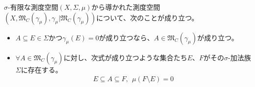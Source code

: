 \documentclass[dvipdfmx]{jsarticle}
\begin{document}
\begin{thm}\label{4.5.3.25}
$\sigma$-有限な測度空間$(X,\varSigma,\mu)$から導かれた測度空間$\left( X,\mathfrak{M}_{C}\left( \gamma_{\mu} \right),\gamma_{\mu}|\mathfrak{M}_{C}\left( \gamma_{\mu} \right) \right)$について、次のことが成り立つ。
\begin{itemize}
\item
  $A \subseteq E \in \varSigma$かつ$\gamma_{\mu}(E) = 0$が成り立つなら、$A \in \mathfrak{M}_{C}\left( \gamma_{\mu} \right)$が成り立つ。
\item
  $\forall A \in \mathfrak{M}_{C}\left( \gamma_{\mu} \right)$に対し、次式が成り立つような集合たち$E$、$F$がその$\sigma$-加法族$\varSigma$に存在する。
\begin{align*}
E \subseteq A \subseteq F,\ \ \mu(F \setminus E) = 0
\end{align*}
\end{itemize}
\end{thm}
\end{document}
